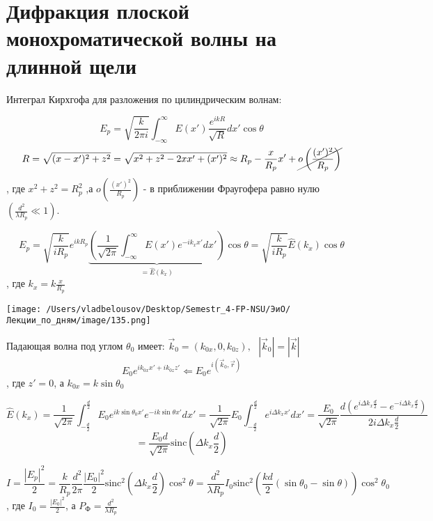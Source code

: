 \documentclass[12pt, a4paper]{report}
\begin{document}
\fi




\section{Дифракция плоской монохроматической волны на длинной щели}

Интеграл Кирхгофа для разложения по цилиндрическим волнам:

\[ E_p = \sqrt{\frac{k}{2 \pi i } } \int_{-\infty}^{\infty}   E(x' ) \frac{e^{i k R } }{\sqrt{R}} d x ' \cos \theta  \] 
\[ R = \sqrt{(x -x ' ) ^2 + z ^2 } = \sqrt{x ^2 + z ^2 - 2 x x' + (x' ) ^2 } \approx R_p -\frac{x}{R_p }x '      + \cancel{ o\left( \frac{(x') ^2 }{R_p}  \right)} \] 
, где \( x ^2+ z ^2 = R_p ^2  \) ,а \( o\left( \displaystyle \frac{(x') ^2 }{R_p}  \right) \) - в приближении Фраугофера равно нулю \( \left( \displaystyle  \frac{d ^2 }{\lambda R_p } \ll 1  \right) \).

\[ E_p = \sqrt{\frac{k}{ i R_p} } e^{ i k R_p } \underbrace{\left( \frac{1}{\sqrt{2 \pi } } \int_{-\infty}^{\infty}  E(x' ) e^{ - i k_x x ' } dx '    \right)}_{= \hat{E } (k_x)} \cos  \theta = \sqrt{\frac{k}{i R_p } } \hat{E } (k_x )\cos \theta  \] 
, где \( \displaystyle  k_x = k \frac{x}{R_p}  \) 

\begin{center}
    \texttt{[image: /Users/vladbelousov/Desktop/Semestr\_4-FP-NSU/ЭиО/Лекции\_по\_дням/image/135.png]}
\end{center}
Падающая волна  под углом \( \theta_0 \)  имеет: \( \vec{k }_0  = (k_{0x } , 0 , k_{0z} ) , \text{ }  |\vec{k } _0   | = |\vec{k } | \) 
\[ E_0 e^{ ik_{0x }x'  + i k_{0z } z'  }  \Leftarrow E_0 e^{i (\vec{k } _0 , \vec{r} )} \] 
, где \( z ' = 0 \), а \( k_{0x} = k \sin \theta_0  \) 

\[ \hat{E } (k_x ) = \frac{1}{\sqrt{2 \pi}} \int_{- \frac{d}{2 } }^{\frac{d}{2 }  } E_0 e^{ i k \sin \theta_0 x' } e^{ - ik \sin \theta x ' } d x' = \frac{1}{\sqrt{2 \pi}}    E_0 \int_{- \frac{d}{2 } }^{\frac{d}{2 }  } e^{ i \Delta k_x x' }dx ' = \frac{ E_0}{\sqrt{ 2 \pi } } \frac{d (e^{ i \Delta k_x \frac{d}{2 } }- e^{ - i \Delta k_x \frac{d}{2 } })  }{2 i \Delta k_x \frac{d}{2} }   \] 
\[=\frac{E_0 d }{\sqrt{2 \pi }}  \mathrm{sinc } \left( \Delta k_x \frac{d}{2 }  \right)  \] 

\[ I = \frac{\left\lvert  E_p    \right\rvert ^2 }{2 } = \frac{k }{R_p } \frac{ d ^2 }{2 \pi } \frac{\left\lvert E_0  \right\rvert ^2}{2 } \mathrm{sinc } ^2 \left( \Delta k_x \frac{d}{2 }  \right) \cos ^2 \theta =      \frac{ d ^2 }{\lambda R_p } I_0 \mathrm{sinc } ^2 \left(  \frac{kd }{2 }  (\sin \theta_0 - \sin \theta) \right)  \cos  ^2 \theta_0 \] 
, где \( \displaystyle  I_0 = \frac{\left\lvert E_0  \right\rvert ^2}{2}  \), а \(\displaystyle  P_{\text{Ф} } = \frac{d ^2 }{ \lambda R_p}   \) 
\end{document}
